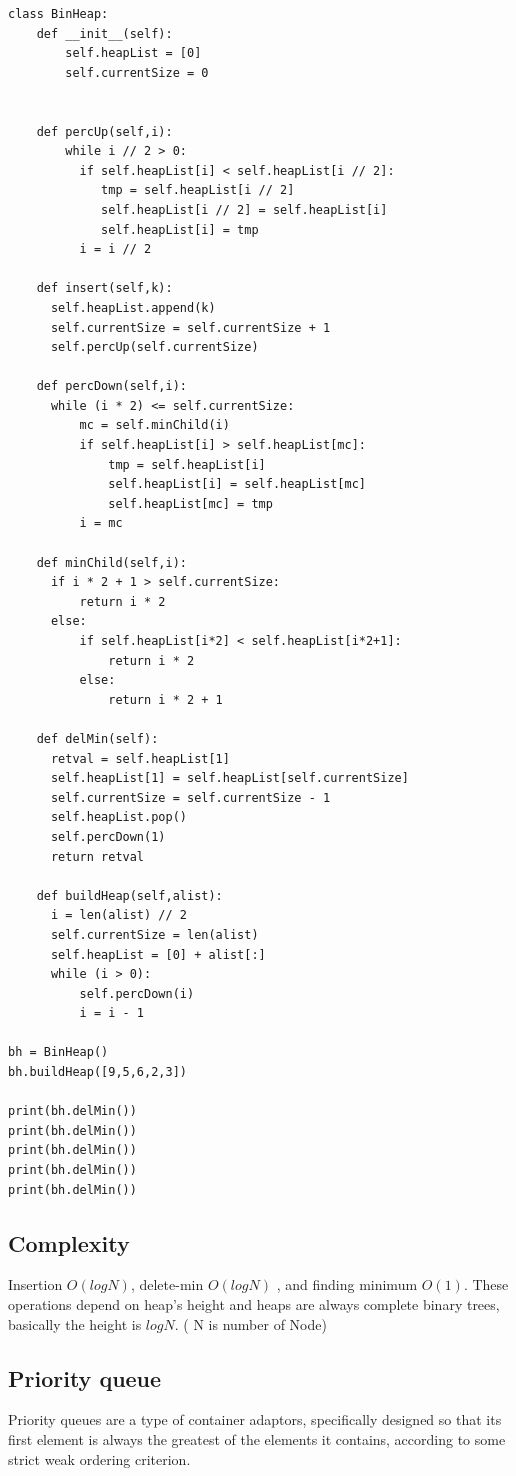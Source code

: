 \documentclass[12pt]{article}
\begin{document}
    \begin{verbatim}
class BinHeap:
    def __init__(self):
        self.heapList = [0]
        self.currentSize = 0


    def percUp(self,i):
        while i // 2 > 0:
          if self.heapList[i] < self.heapList[i // 2]:
             tmp = self.heapList[i // 2]
             self.heapList[i // 2] = self.heapList[i]
             self.heapList[i] = tmp
          i = i // 2

    def insert(self,k):
      self.heapList.append(k)
      self.currentSize = self.currentSize + 1
      self.percUp(self.currentSize)

    def percDown(self,i):
      while (i * 2) <= self.currentSize:
          mc = self.minChild(i)
          if self.heapList[i] > self.heapList[mc]:
              tmp = self.heapList[i]
              self.heapList[i] = self.heapList[mc]
              self.heapList[mc] = tmp
          i = mc

    def minChild(self,i):
      if i * 2 + 1 > self.currentSize:
          return i * 2
      else:
          if self.heapList[i*2] < self.heapList[i*2+1]:
              return i * 2
          else:
              return i * 2 + 1

    def delMin(self):
      retval = self.heapList[1]
      self.heapList[1] = self.heapList[self.currentSize]
      self.currentSize = self.currentSize - 1
      self.heapList.pop()
      self.percDown(1)
      return retval

    def buildHeap(self,alist):
      i = len(alist) // 2
      self.currentSize = len(alist)
      self.heapList = [0] + alist[:]
      while (i > 0):
          self.percDown(i)
          i = i - 1

bh = BinHeap()
bh.buildHeap([9,5,6,2,3])

print(bh.delMin())
print(bh.delMin())
print(bh.delMin())
print(bh.delMin())
print(bh.delMin())
\end{verbatim}

\subsection{Complexity}
        Insertion $O(logN)$, delete-min $O(logN)$ , and finding minimum $O(1)$. These operations depend on heap's height and heaps  are always complete binary trees, basically the height is $logN$. ( N is number of Node)
        \newpage
\subsection{Priority queue}
    Priority queues are a type of container adaptors, specifically designed so that its first element is always the greatest of the elements it contains, according to some strict weak ordering criterion.
\end{document}

